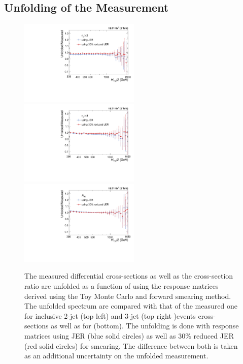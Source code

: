 \subsection{Unfolding of the Measurement}
\label{subsec:unf}
\begin{figure}[!h]
 \begin{center}
 \hspace*{-3mm}\includegraphics[width=0.51\textwidth]{Plots_HT_2_150/Ratio_Unfolding_data_NLO_2.pdf}%
 ~~\includegraphics[width=0.51\textwidth]{Plots_HT_2_150/Ratio_Unfolding_data_NLO_3.pdf}\\
 \includegraphics[width=0.51\textwidth]{Plots_HT_2_150/Ratio_Unfolding_data_NLO_ratio32.pdf}
 \caption[The measured differential cross-sections as well as the cross-section ratio \ratio are unfolded as a function of \httwo using the response matrices derived using the Toy Monte Carlo and forward smearing method.]{The measured differential cross-sections as well as the cross-section ratio \ratio are unfolded as a function of \httwo using the response matrices derived using the Toy Monte Carlo and forward smearing method. The unfolded spectrum are compared with that of the measured one for inclusive 2-jet (top left) and 3-jet (top right )events cross-sections as well as for \ratio (bottom). The unfolding is done with response matrices using JER (blue solid circles) as well as 30\% reduced JER (red solid circles) for smearing. The difference between both is taken as an additional uncertainty on the unfolded measurement.}
 \label{fig:unfolded_data}
 \end{center}
\end{figure}

